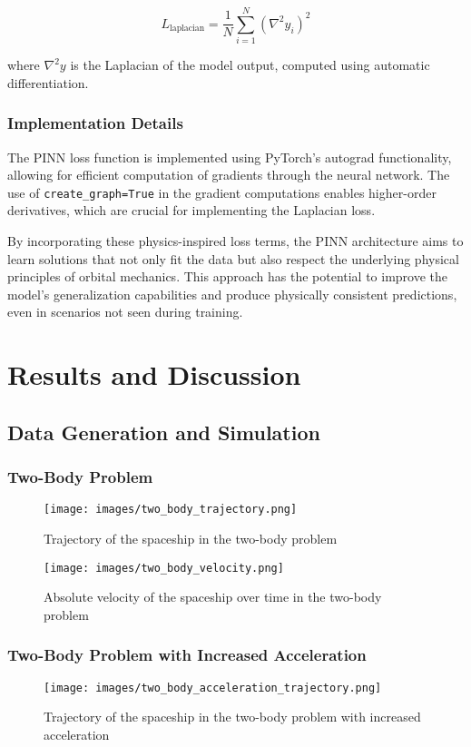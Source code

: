 \documentclass[12pt,a4paper]{article}
\begin{document}
\[ L_{\text{laplacian}} = \frac{1}{N} \sum_{i=1}^N \left(\nabla^2 y_i\right)^2 \]

where $\nabla^2 y$ is the Laplacian of the model output, computed using automatic differentiation.

\subsubsection{Implementation Details}
The PINN loss function is implemented using PyTorch's autograd functionality, allowing for efficient computation of gradients through the neural network. The use of \texttt{create\_graph=True} in the gradient computations enables higher-order derivatives, which are crucial for implementing the Laplacian loss.

By incorporating these physics-inspired loss terms, the PINN architecture aims to learn solutions that not only fit the data but also respect the underlying physical principles of orbital mechanics. This approach has the potential to improve the model's generalization capabilities and produce physically consistent predictions, even in scenarios not seen during training.
\section{Results and Discussion}
\label{sec:results}

\subsection{Data Generation and Simulation}

\subsubsection{Two-Body Problem}
\begin{figure}[h]
    \centering
    \texttt{[image: images/two\_body\_trajectory.png]}
    \caption{Trajectory of the spaceship in the two-body problem}
    \label{fig:two_body_trajectory}
\end{figure}

\begin{figure}[h]
    \centering
    \texttt{[image: images/two\_body\_velocity.png]}
    \caption{Absolute velocity of the spaceship over time in the two-body problem}
    \label{fig:two_body_velocity}
\end{figure}

\subsubsection{Two-Body Problem with Increased Acceleration}
\begin{figure}[h]
    \centering
    \texttt{[image: images/two\_body\_acceleration\_trajectory.png]}
    \caption{Trajectory of the spaceship in the two-body problem with increased acceleration}
    \label{fig:two_body_acceleration_trajectory}
\end{figure}
\end{document}
